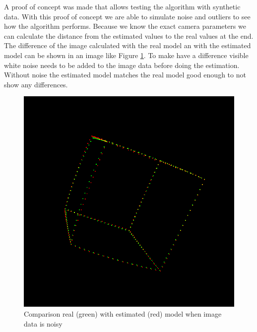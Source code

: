 \documentclass[11pt,a4paper,titlepage,oneside]{report}
\begin{document}
A proof of concept was made that allows testing the algorithm with synthetic data. With this proof of concept we are able to simulate noise and outliers to see how the algorithm performs. Because we know the exact camera parameters we can calculate the distance from the estimated values to the real values at the end. The difference of the image calculated with the real model an with the estimated model can be shown in an image like Figure \ref{fig:diff_img}. To make have a difference visible white noise needs to be added to the image data before doing the estimation. Without noise the estimated model matches the real model good enough to not show any differences.
\begin{figure}[H]
  \begin{center}
		\includegraphics[width=1.0\textwidth]{img/diff_img.png}
  \end{center}
	\caption{Comparison real (green) with estimated (red) model when image data is noisy}\label{fig:diff_img}
\end{figure}
\end{document}
